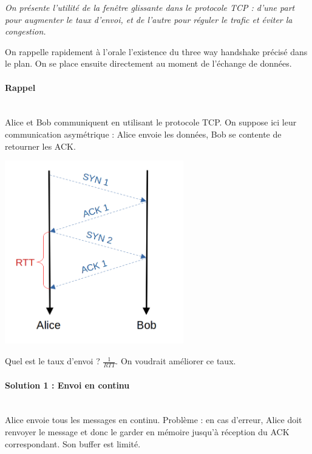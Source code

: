 
\textit{On présente l'utilité de la fenêtre glissante dans le protocole TCP : d'une part pour augmenter le taux d'envoi, et de l'autre pour réguler le trafic et éviter la congestion.}

\begin{com}
	On rappelle rapidement à l'orale l'existence du three way handshake précisé dans le plan. On se place ensuite directement au moment de l'échange de données.
\end{com}

\paragraph{Rappel}
\enspace\\
Alice et Bob communiquent en utilisant le protocole TCP. On suppose ici leur communication asymétrique : Alice envoie les données, Bob se contente de retourner les ACK. 

\begin{center}
	\includegraphics[height = 8cm]{Developpements/TCP/basique.png} \\
\end{center}

Quel est le taux d'envoi ? $\frac{1}{RTT}$. On voudrait améliorer ce taux. 

\paragraph{Solution 1 : Envoi en continu}
\enspace\\
Alice envoie tous les messages en continu. Problème : en cas d'erreur, Alice doit renvoyer le message et donc le garder en mémoire jusqu'à réception du ACK correspondant. Son buffer est limité. \\

